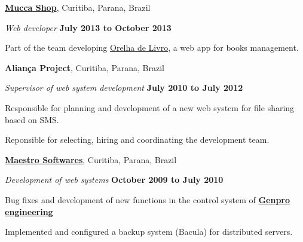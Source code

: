 \documentclass[10pt]{article}
\newenvironment{outerlist}[1][\enskip\textbullet]%
        {\begin{itemize}[#1]}{\end{itemize}%
         \vspace{-.6\baselineskip}}
\newenvironment{innerlist}[1][\enskip\textbullet]%
        {\begin{compactitem}[#1]}{\end{compactitem}}
\newcommand{\blankline}{\quad\pagebreak[2]}
\begin{document}
\blankline

\href{http://www.muccashop.com.br/}{\textbf{Mucca Shop}},
Curitiba, Parana, Brazil
\begin{outerlist}

\item[] \textit{Web developer}%
        \hfill \textbf{July 2013 to October 2013}
\begin{innerlist}
\item Part of the team developing \href{http://www.orelhadelivro.com.br/}{Orelha de Livro}, a web
app for books management.
\end{innerlist}

\end{outerlist}

\blankline

\textbf{Alian\c{c}a Project},
Curitiba, Parana, Brazil
\begin{outerlist}

\item[] \textit{Supervisor of web system development}%
        \hfill \textbf{July 2010 to July 2012}
\begin{innerlist}
\item Responsible for planning and development of a new web system for file sharing based on SMS.
\item Reponsible for selecting, hiring and coordinating the development team.
\end{innerlist}

\end{outerlist}

\blankline

\href{http://www.maestrosoft.com.br/}{\textbf{Maestro Softwares}},
Curitiba, Parana, Brazil
\begin{outerlist}

\item[] \textit{Development of web systems}%
        \hfill \textbf{October 2009 to July 2010}
\begin{innerlist}
\item Bug fixes and development of new functions in the control system
  of \href{http://www.genpro.com.br/}{\textbf{Genpro engineering}}
\item Implemented and configured a backup system (Bacula) for
  distributed servers.
\end{innerlist}

\end{outerlist}

\blankline
\end{document}
